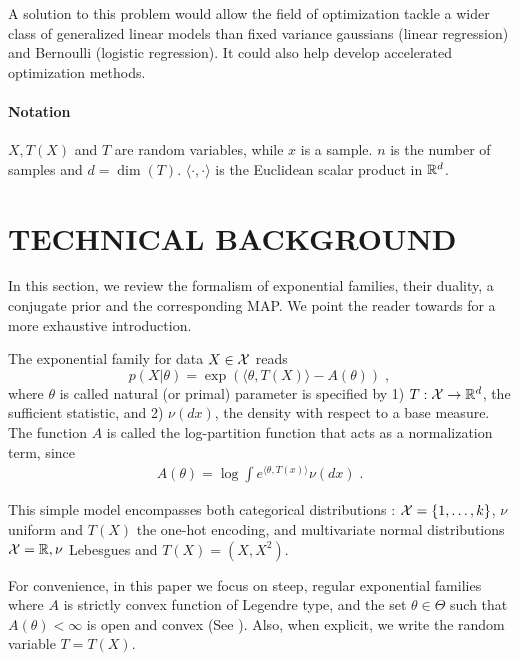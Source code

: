 \documentclass[twoside]{article}
\let\oldsection\section
\renewcommand{\section}[1]{\oldsection{\texorpdfstring{\uppercase{#1}}{#1}}}
\newcommand{\logpart}{A}
\newcommand{\nat}{\theta}
\begin{document}
A solution to this problem would allow the field of optimization tackle a wider class of generalized linear models than fixed variance gaussians (linear regression) and Bernoulli (logistic regression).
It could also help develop accelerated optimization methods.

\paragraph{Notation}
$X, T(X)$ and $T$ are random variables, while $x$ is a sample. 
$n$ is the number of samples and $d= \dim(T)$. 
$\langle \cdot , \cdot \rangle$ is the Euclidean scalar product in $\mathbb{R}^d$.


\section{Technical background}
In this section, we review the formalism of exponential families, their duality, a conjugate prior and the corresponding MAP.
We point the reader towards \citet[Chapter 3]{wainwright2008graphical} for a more exhaustive introduction.


The exponential family for data $X\in {\mathcal X}$ reads
\begin{equation}
	 p(X|\nat) = \exp( \langle \nat, T(X) \rangle - \logpart(\nat)) \; ,
	 \label{eq:def_expfamily}
\end{equation}
where  $\nat$ is called natural (or primal) parameter is specified by 1) $T: {\mathcal X} \rightarrow \mathbb{R}^d$, the sufficient statistic, and 2) $\nu(dx)$, the density with respect to a base measure.
The function $\logpart$ is called the log-partition function that acts as a normalization term, since
\begin{align}
    \logpart(\nat) = \log \int e^{\langle \nat, T(x) \rangle} \nu(dx) \; .
\end{align}

This simple model encompasses both categorical distributions : ${\mathcal X} = \{1, \dots, k\}$, $\nu$ uniform and $T(X)$  the one-hot encoding, and multivariate normal distributions ${\mathcal X}=\mathbb{R}, \nu$ Lebesgues and $T(X)=(X, X^2)$.

For convenience, in this paper we focus on steep, regular exponential families
where $\logpart$ is strictly convex function of Legendre type,
and the set $\nat \in \Theta$ such that $\logpart(\nat) < \infty$ is open and convex
(See \citet{barndoffnielsen2014information}). Also, when explicit, we write the random variable $T = T(X)$.

\end{document}
